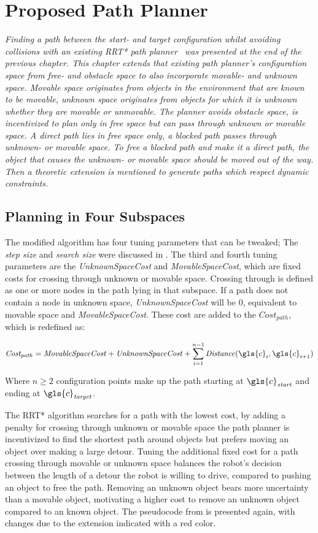 \chapter{Proposed Path Planner}%
\label{chap:proposed_planning}
\textit{Finding a path between the start- and target configuration whilst avoiding collisions with an existing \ac{RRT*} path planner~\cite{chen_fast_2018} was presented at the end of the previous chapter. This chapter extends that existing path planner's configuration space from free- and obstacle space to also incorporate movable- and unknown space. Movable space originates from objects in the environment that are known to be movable, unknown space originates from objects for which it is unknown whether they are movable or unmovable. The planner avoids obstacle space, is incentivized to plan only in free space but can pass through unknown or movable space. A direct path lies in free space only, a blocked path passes through unknown- or movable space. To free a blocked path and make it a direct path, the object that causes the unknown- or movable space should be moved out of the way. Then a theoretic extension is mentioned to generate paths which respect dynamic constraints.\bs}

\section{Planning in Four Subspaces}\label{sec:planning_in_four_subspaces}
The modified algorithm has four tuning parameters that can be tweaked; The \textit{step size} and \textit{search size} were discussed in . The third and fourth tuning parameters are the \textit{UnknownSpaceCost} and \textit{MovableSpaceCost}, which are fixed costs for crossing through unknown or movable space. Crossing through is defined as one or more nodes in the path lying in that subspace. If a path does not contain a node in unknown space, \textit{UnknownSpaceCost} will be 0, equivalent to movable space and \textit{MovableSpaceCost}. These cost are added to the $\mathit{Cost_{path}}$, which is redefined as:\bs

\[\mathit{Cost_{path}} = \mathit{MovableSpaceCost} + \mathit{UnknownSpaceCost} + \sum_{i=1}^{n-1} \mathit{Distance}(\gls{c}_i, \gls{c}_{i+1})\]

Where $\mathit{n} \geq 2$ configuration points make up the path starting at $\gls{c}_\mathit{start}$ and ending at $\gls{c}_\mathit{target}$.\bs

The \ac{RRT*} algorithm searches for a path with the lowest cost, by adding a penalty for crossing through unknown or movable space the path planner is incentivized to find the shortest path around objects but prefers moving an object over making a large detour. Tuning the additional fixed cost for a path crossing through movable or unknown space balances the robot's decision between the length of a detour the robot is willing to drive, compared to pushing an object to free the path. Removing an unknown object bears more uncertainty than a movable object, motivating a higher cost to remove an unknown object compared to an known object. The pseudocode from  is presented again, with changes due to the extension indicated with a red color.\bs

